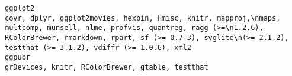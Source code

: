 \documentclass[
  letterpaper,
  DIV=11,
  numbers=noendperiod]{scrreprt}
\begin{document}
\begin{verbatim}
ggplot2                                                                                                                                                                                                                                                                                                                                                                                                                                                                                                                                                                                                                                                                                                                                                                                                                                                                                                                                                                                                                                                      covr, dplyr, ggplot2movies, hexbin, Hmisc, knitr, mapproj,\nmaps, multcomp, munsell, nlme, profvis, quantreg, ragg (>=\n1.2.6), RColorBrewer, rmarkdown, rpart, sf (>= 0.7-3), svglite\n(>= 2.1.2), testthat (>= 3.1.2), vdiffr (>= 1.0.6), xml2
ggpubr                                                                                                                                                                                                                                                                                                                                                                                                                                                                                                                                                                                                                                                                                                                                                                                                                                                                                                                                                                                                                                                                                                                                                                                                                                                       grDevices, knitr, RColorBrewer, gtable, testthat

\end{verbatim}
\end{document}
